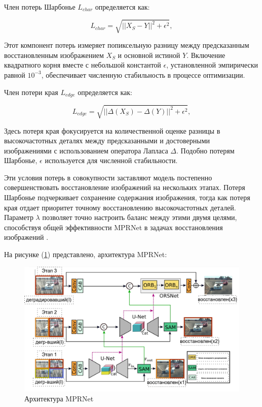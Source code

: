 Член потерь Шарбонье \( L_{char} \) определяется как:

\begin{equation}
	L_{char} = \sqrt{\vert\vert X_S - Y \vert\vert^2 + \epsilon^2},
\end{equation}

Этот компонент потерь измеряет попиксельную разницу между предсказанным восстановленным изображением \( X_S \) и основной истиной \( Y \). Включение квадратного корня вместе с небольшой константой \( \epsilon \), установленной эмпирически равной \( 10^{-3} \), обеспечивает численную стабильность в процессе оптимизации.

Член потери края \( L_{edge} \) определяется как:

\begin{equation}
	L_{edge} = \sqrt{\vert\vert\Delta(X_S) - \Delta(Y)\vert\vert^2 + \epsilon^2},
\end{equation}

Здесь потеря края фокусируется на количественной оценке разницы в высокочастотных деталях между предсказанными и достоверными изображениями с использованием оператора Лапласа \(\Delta\). Подобно потерям Шарбонье, \( \epsilon \) используется для численной стабильности.

Эти условия потерь в совокупности заставляют модель постепенно совершенствовать восстановление изображений на нескольких этапах. Потеря Шарбонье подчеркивает сохранение содержания изображения, тогда как потеря края отдает приоритет точному восстановлению высокочастотных деталей. Параметр \( \lambda \) позволяет точно настроить баланс между этими двумя целями, способствуя общей эффективности MPRNet в задачах восстановления изображений \cite{zamir2021multi}.

На рисунке (\ref{fig:MPRNet}) представлено, архитектура MPRNet: 
\begin{figure}[H]
	\centering
	\includegraphics[width=0.7\linewidth]{assets/MPRNet.png}
	\caption{Архитектура MPRNet}
	\label{fig:MPRNet}
\end{figure}

